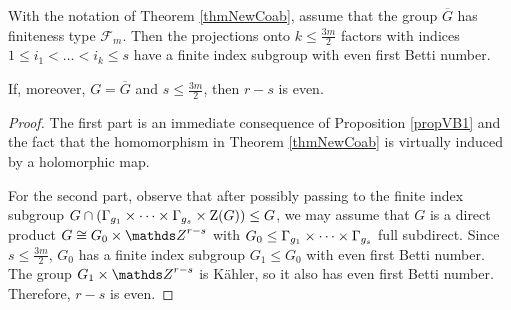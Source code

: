 \begin{corollary}
 With the notation of Theorem \ref{thmNewCoab}, assume that the group $\overline{G}$ has finiteness type $\mathcal{F}_m$. Then the projections onto $k\leq \frac{3m}{2}$ factors with indices $1\leq i_1 < \dots < i_k\leq s$ have a finite index subgroup with even first Betti number. 
 
 If, moreover, $G=\overline{G}$ and $s\leq \frac{3m}{2}$, then $r-s$ is even.
\end{corollary}
\begin{proof}
The first part is an immediate consequence of Proposition \ref{propVB1} and the fact that the homomorphism in Theorem \ref{thmNewCoab} is virtually induced by a holomorphic map.

For the second part, observe that after possibly passing to the finite index subgroup $G\cap \left(\Gamma_{g_1}\times \dots \times \Gamma_{g_s} \times \mathrm{Z}(G)\right)\leq G$, we may assume that $G$ is a direct product $G\cong G_0 \times \ZZ^{r-s}$ with $G_0\leq \Gamma_{g_1}\times \dots \times \Gamma_{g_s}$ full subdirect. Since $s\leq \frac{3m}{2}$, $G_0$ has a finite index subgroup $G_1\leq G_0$ with even first Betti number. The group $G_1 \times \ZZ^{r-s}$ is K\"ahler, so it also has even first Betti number. Therefore, $r-s$ is even.
\end{proof}


